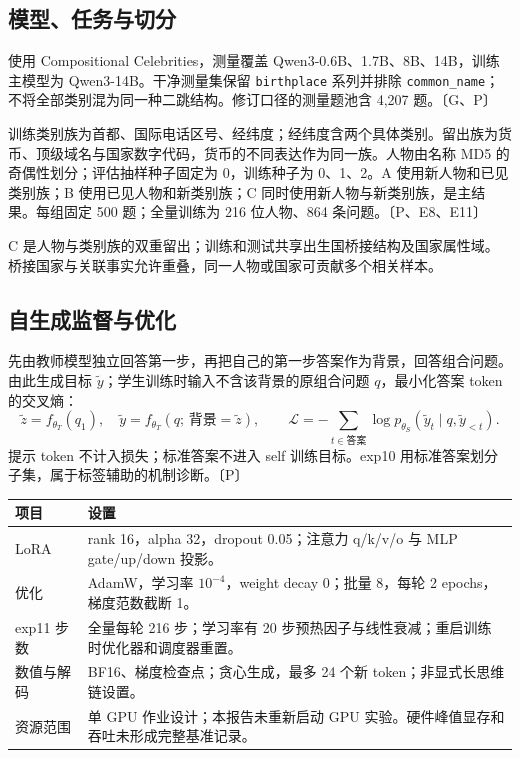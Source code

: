 \documentclass[11pt,a4paper]{article}
\newcommand{\ev}[1]{{\color{muted}\small〔#1〕}}
\begin{document}
\subsection{模型、任务与切分}
使用 Compositional Celebrities，测量覆盖 Qwen3-0.6B、1.7B、8B、14B，训练主模型为 Qwen3-14B。干净测量集保留 \texttt{birthplace} 系列并排除 \texttt{common\_name}；不将全部类别混为同一种二跳结构。修订口径的测量题池含 4,207 题。\ev{G、P}

训练类别族为首都、国际电话区号、经纬度；经纬度含两个具体类别。留出族为货币、顶级域名与国家数字代码，货币的不同表达作为同一族。人物由名称 MD5 的奇偶性划分；评估抽样种子固定为 0，训练种子为 0、1、2。A 使用新人物和已见类别族；B 使用已见人物和新类别族；C 同时使用新人物与新类别族，是主结果。每组固定 500 题；全量训练为 216 位人物、864 条问题。\ev{P、E8、E11}

C 是人物与类别族的双重留出；训练和测试共享出生国桥接结构及国家属性域。桥接国家与关联事实允许重叠，同一人物或国家可贡献多个相关样本。
\subsection{自生成监督与优化}
先由教师模型独立回答第一步，再把自己的第一步答案作为背景，回答组合问题。由此生成目标 $\tilde y$；学生训练时输入不含该背景的原组合问题 $q$，最小化答案 token 的交叉熵：
\[
\tilde z=f_{\theta_T}(q_1),\quad
\tilde y=f_{\theta_T}(q;\,\text{背景}=\tilde z),\qquad
\mathcal L=-\sum_{t\in\text{答案}}\log p_{\theta_S}(\tilde y_t\mid q,\tilde y_{<t}).
\]
提示 token 不计入损失；标准答案不进入 self 训练目标。exp10 用标准答案划分子集，属于标签辅助的机制诊断。\ev{P}
\begin{center}\small
{}
\begin{tabularx}{\linewidth}{@{}p{34mm}Y@{}}\toprule
项目 & 设置 \\\midrule
LoRA & rank 16，alpha 32，dropout 0.05；注意力 q/k/v/o 与 MLP gate/up/down 投影。\\
优化 & AdamW，学习率 $10^{-4}$，weight decay 0；批量 8，每轮 2 epochs，梯度范数截断 1。\\
exp11 步数 & 全量每轮 216 步；学习率有 20 步预热因子与线性衰减；重启训练时优化器和调度器重置。\\
数值与解码 & BF16、梯度检查点；贪心生成，最多 24 个新 token；非显式长思维链设置。\\
资源范围 & 单 GPU 作业设计；本报告未重新启动 GPU 实验。硬件峰值显存和吞吐未形成完整基准记录。\\\bottomrule
\end{tabularx}
\end{center}
\end{document}
